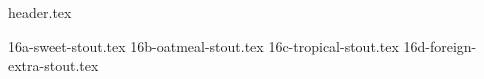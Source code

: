 \clearpage
{}
\divisorLine

{header.tex}

\begin{multicols}{2}

{16a-sweet-stout.tex}
{16b-oatmeal-stout.tex}
{16c-tropical-stout.tex}
{16d-foreign-extra-stout.tex}

\end{multicols}